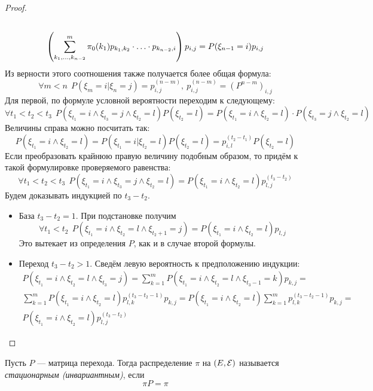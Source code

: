 \begin{proof}
\begin{multline*}
		\\
		\left(\sum_{k_1, \ldots, k_{n - 2}}^m \pi_0(k_1)p_{k_1, k_2} \cdot \ldots \cdot p_{k_{n - 2}, i}\right)p_{i, j} = P(\xi_{n - 1} = i)p_{i, j}
	\end{multline*}
	Из верности этого соотношения также получается более общая формула:
	\[
		\forall m < n\ \ P(\xi_m = i | \xi_n = j) = p_{i, j}^{(n - m)},\ p_{i, j}^{(n - m)} = (P^{n - m})_{i, j}
	\]
	Для первой, по формуле условной вероятности переходим к следующему:
	\[
		\forall t_1 < t_2 < t_3\ \ P(\xi_{t_1} = i \wedge \xi_{t_3} = j \wedge \xi_{t_2} = l)P(\xi_{t_2} = l) = P(\xi_{t_1} = i \wedge \xi_{t_2} = l) \cdot P(\xi_{t_3} = j \wedge \xi_{t_2} = l)
	\]
	Величины справа можно посчитать так:
	\[
		P(\xi_{t_1} = i \wedge \xi_{t_2} = l) = P(\xi_{t_1} = i | \xi_{t_2} = l)P(\xi_{t_2} = l) = p_{i, l}^{(t_2 - t_1)}P(\xi_{t_2} = l)
	\]
	Если преобразовать крайнюю правую величину подобным образом, то придём к такой формулировке проверяемого равенства:
	\[
		\forall t_1 < t_2 < t_3\ \ P(\xi_{t_1} = i \wedge \xi_{t_3} = j \wedge \xi_{t_2} = l) = P(\xi_{t_1} = i \wedge \xi_{t_2} = l)p_{l, j}^{(t_3 - t_2)}
	\]
	Будем доказывать индукцией по $t_3 - t_2$.
	\begin{itemize}
		\item База $t_3 - t_2 = 1$. При подстановке получим
		\[
			\forall t_1 < t_2\ \ P(\xi_{t_1} = i \wedge \xi_{t_2} = l \wedge \xi_{t_2 + 1} = j) = P(\xi_{t_1} = i \wedge \xi_{t_2} = l)p_{l, j}
		\]
		Это вытекает из определения $P$, как и в случае второй формулы.
		
		\item Переход $t_3 - t_2 > 1$. Сведём левую вероятность к предположению индукции:
		\begin{multline*}
			P(\xi_{t_1} = i \wedge \xi_{t_2} = l \wedge \xi_{t_3} = j) = \sum_{k = 1}^m P(\xi_{t_1} = i \wedge \xi_{t_2} = l \wedge \xi_{t_3 - 1} = k)p_{k, j} =
			\\
			\sum_{k = 1}^m P(\xi_{t_1} = i \wedge \xi_{t_2} = l)p_{l, k}^{(t_3 - t_2 - 1)}p_{k, j} = P(\xi_{t_1} = i \wedge \xi_{t_2} = l) \sum_{k = 1}^m p_{l, k}^{(t_3 - t_2 - 1)}p_{k, j} =
			\\
			P(\xi_{t_1} = i \wedge \xi_{t_2} = l)p_{l, j}^{(t_3 - t_2)}
		\end{multline*}
	\end{itemize}
\end{proof}

\begin{definition}
	Пусть $P$ --- матрица перехода. Тогда распределение $\pi$ на $(E, \mathcal{E})$ называется \textit{стационарным (инвариантным)}, если
	\[
		\pi P = \pi
	\]
\end{definition}

